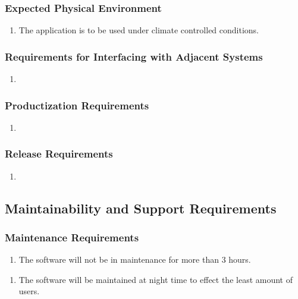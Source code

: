 \documentclass[]{article}
\begin{document}
\subsubsection{Expected Physical Environment}
\label{ssub:expected_physical_environment}
\begin{enumerate}[{OE}1. ]
	\item The application is to be used under climate controlled conditions.
\end{enumerate}

\subsubsection{Requirements for Interfacing with Adjacent Systems}
\label{ssub:requirements_for_interfacing_with_adjacent_systems}
\begin{enumerate}[{OE}1. ]
	\item
\end{enumerate}

\subsubsection{Productization Requirements}
\label{ssub:productization_requirements}
\begin{enumerate}[{OE}1. ]
	\item
\end{enumerate}

\subsubsection{Release Requirements}
\label{ssub:release_requirements}
\begin{enumerate}[{OE}1. ]
	\item
\end{enumerate}


\subsection{Maintainability and Support Requirements}
\label{sub:maintainability_and_support_requirements}

\subsubsection{Maintenance Requirements}
\label{ssub:maintenance_requirements}
\begin{enumerate}[{MS}1. ]
	\item The software will not be in maintenance for more than 3 hours.
\end{enumerate}
\begin{enumerate}[{MS}2. ]
	\item The software will be maintained at night time to effect the least amount of users. 
\end{enumerate}
\end{document}
